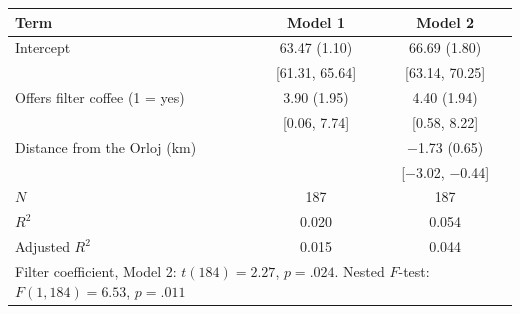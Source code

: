 \begin{tabular}{lcc}
\toprule
Term & Model 1 & Model 2 \\
\midrule
Intercept & 63.47 (1.10) & 66.69 (1.80) \\
 & [61.31, 65.64] & [63.14, 70.25] \\
Offers filter coffee (1 = yes) & 3.90 (1.95) & 4.40 (1.94) \\
 & [0.06, 7.74] & [0.58, 8.22] \\
Distance from the Orloj (km) &  & \ensuremath{-}1.73 (0.65) \\
 &  & [\ensuremath{-}3.02, \ensuremath{-}0.44] \\
\midrule
$N$ & 187 & 187 \\
$R^2$ & 0.020 & 0.054 \\
Adjusted $R^2$ & 0.015 & 0.044 \\
\midrule
\multicolumn{3}{l}{Filter coefficient, Model 2: $t(184) = 2.27$, $p = .024$. Nested $F$-test: $F(1, 184) = 6.53$, $p = .011$} \\
\bottomrule
\end{tabular}
